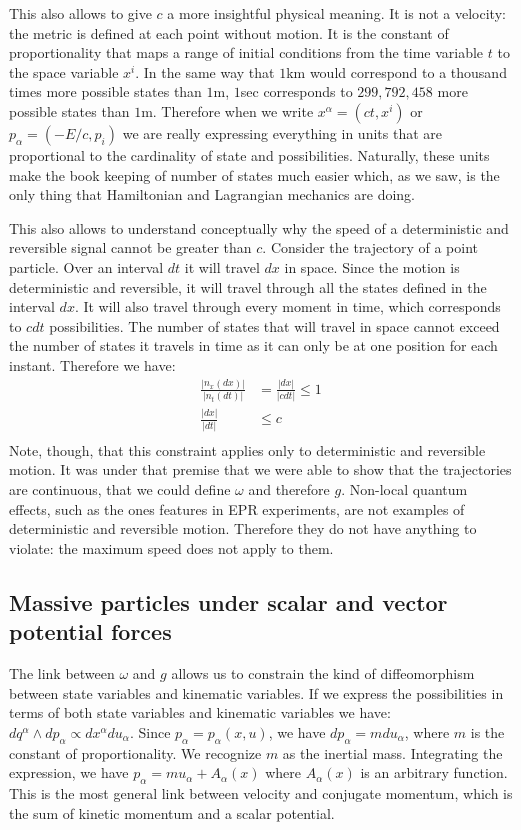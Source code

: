 \documentclass[aps,pra,10pt,twocolumn,floatfix,nofootinbib]{revtex4-1}
\numberwithin{equation}{section}
\theoremstyle{definition}
\begin{document}
This also allows to give $c$ a more insightful physical meaning. It is not a velocity: the metric is defined at each point without motion. It is the constant of proportionality that maps a range of initial conditions from the time variable $t$ to the space variable $x^i$. In the same way that $1$km would correspond to a thousand times more possible states than $1$m, $1$sec corresponds to $299,792,458$ more possible states than $1$m. Therefore when we write $x^\alpha = (ct, x^i)$ or $p_\alpha = (- E/c, p_i)$ we are really expressing everything in units that are proportional to the cardinality of state and possibilities. Naturally, these units make the book keeping of number of states much easier which, as we saw, is the only thing that Hamiltonian and Lagrangian mechanics are doing.

This also allows to understand conceptually why the speed of a deterministic and reversible signal cannot be greater than $c$. Consider the trajectory of a point particle. Over an interval $dt$ it will travel $dx$ in space. Since the motion is deterministic and reversible, it will travel through all the states defined in the interval $dx$. It will also travel through every moment in time, which corresponds to $cdt$ possibilities. The number of states that will travel in space cannot exceed the number of states it travels in time as it can only be at one position for each instant. Therefore we have:
\begin{align*}
\frac{|n_x(dx)|}{|n_t(dt)|} &=  \frac{|dx|}{|c dt|} \leq 1 \\
\frac{|dx|}{|dt|} & \leq c \\
\end{align*}
Note, though, that this constraint applies only to deterministic and reversible motion. It was under that premise that we were able to show that the trajectories are continuous, that we could define $\omega$ and therefore $g$. Non-local quantum effects, such as the ones features in EPR experiments, are not examples of deterministic and reversible motion. Therefore they do not have anything to violate: the maximum speed does not apply to them.

\subsection{Massive particles under scalar and vector potential forces}


The link between $\omega$ and $g$ allows us to constrain the kind of diffeomorphism between state variables and kinematic variables. If we express the possibilities in terms of both state variables and kinematic variables we have: $dq^\alpha \wedge dp_\alpha \propto dx^\alpha du_\alpha$. Since  $p_\alpha=p_\alpha(x, u)$, we have $dp_\alpha = m du_\alpha$, where $m$ is the constant of proportionality. We recognize $m$ as the inertial mass. Integrating the expression, we have $p_\alpha = m u_\alpha + A_\alpha(x)$ where $A_\alpha(x)$ is an arbitrary function. This is the most general link between velocity and conjugate momentum, which is the sum of kinetic momentum and a scalar potential.
\end{document}
